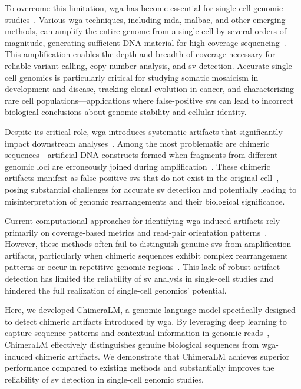 \documentclass[pdflatex,sn-nature]{sn-jnl}%
\theoremstyle{thmstyleone}%
\theoremstyle{thmstyletwo}%
\theoremstyle{thmstylethree}%
\begin{document}
To overcome this limitation, \gls{wga} has become essential for single-cell genomic studies~\cite{zong2012genome, huang2015single}.
Various \gls{wga} techniques, including \gls{mda}, \gls{malbac}, and other emerging methods, can amplify the entire genome from a single cell by several orders of magnitude, generating sufficient DNA material for high-coverage sequencing~\cite{de2014quantitative, biezuner2021comparison,fu2015uniform, agyabeng2025evaluating}.
This amplification enables the depth and breadth of coverage necessary for reliable variant calling, copy number analysis, and \gls{sv} detection.
Accurate single-cell genomics is particularly critical for studying somatic mosaicism in development and disease, tracking clonal evolution in cancer, and characterizing rare cell populations---applications where false-positive \glspl{sv} can lead to incorrect biological conclusions about genomic stability and cellular identity.

Despite its critical role, \gls{wga} introduces systematic artifacts that significantly impact downstream analyses~\cite{lu2023chimera, lu2023exploration}.
Among the most problematic are chimeric sequences—artificial DNA constructs formed when fragments from different genomic loci are erroneously joined during amplification~\cite{lu2023chimera, lu2023exploration, agyabeng2025evaluating}.
These chimeric artifacts manifest as false-positive \glspl{sv} that do not exist in the original cell~\cite{lu2023chimera}, posing substantial challenges for accurate \gls{sv} detection and potentially leading to misinterpretation of genomic rearrangements and their biological significance.

Current computational approaches for identifying \gls{wga}-induced artifacts rely primarily on coverage-based metrics and read-pair orientation patterns~\cite{kiguchi2021long, lu2023exploration}.
However, these methods often fail to distinguish genuine \glspl{sv} from amplification artifacts, particularly when chimeric sequences exhibit complex rearrangement patterns or occur in repetitive genomic regions~\cite{kosugi2019comprehensive, mahmoud2019structural}.
This lack of robust artifact detection has limited the reliability of \gls{sv} analysis in single-cell studies and hindered the full realization of single-cell genomics' potential.

Here, we developed ChimeraLM, a genomic language model specifically designed to detect chimeric artifacts introduced by \gls{wga}.
By leveraging deep learning to capture sequence patterns and contextual information in genomic reads~\cite{dalla2025nucleotide, zhou2023dnabert, nguyen2023hyenadna}, ChimeraLM effectively distinguishes genuine biological sequences from \gls{wga}-induced chimeric artifacts.
We demonstrate that ChimeraLM achieves superior performance compared to existing methods and substantially improves the reliability of \gls{sv} detection in single-cell genomic studies.
\end{document}
